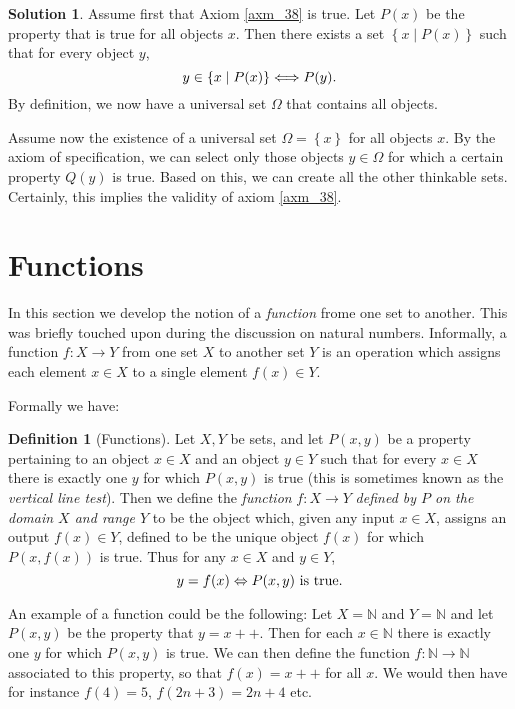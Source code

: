 \documentclass[a4paper, twocolumn]{report}
\newcounter{dummy} \numberwithin{dummy}{section}
\theoremstyle{definition}
\newtheorem{defn}[dummy]{Definition}
\theoremstyle{solution}
\newtheorem*{sltn}{Solution}
\newcommand{\dplus}{{+}{+}} %
\begin{document}
\begin{sltn}
  Assume first that Axiom \ref{axm_38} is true.  Let $P(x)$ be the property
  that is true for all objects $x$. Then there exists a set $\left\{ x \mid
  P(x) \right\}$ such that for every object $y$,
  \begin{equation}
    \notag
    y \in \left\{ x \mid P(x) \right\} \Longleftrightarrow P(y).
  \end{equation}
  By definition, we now have a universal set $\Omega$ that contains all
  objects.   

  Assume now the existence of a universal set $\Omega = \left\{ x \right\}$ for
  all objects $x$.  By the axiom of specification, we can select only those
  objects $y \in \Omega$ for which a certain property $Q(y)$ is true. Based on
  this, we can create all the other thinkable sets. Certainly, this implies the
  validity of axiom \ref{axm_38}. 
\end{sltn}

\section{Functions}

In this section we develop the notion of a \textit{function} frome one set to
another.  This was briefly touched upon during the discussion on natural
numbers. Informally, a function $f : X \rightarrow Y$ from one set $X$ to
another set $Y$ is an operation which assigns each element $x \in X$ to a
single element $f(x) \in Y$. 

Formally we have:
\begin{defn}[Functions]
  \label{defn_331} 
  Let $X, Y$ be sets, and let $P(x, y)$ be a property pertaining to an object
  $x \in X$ and an object $y \in Y$ such that for every $x \in X$ there is
  exactly one $y$ for which $P(x, y)$ is true (this is sometimes known as the
  \textit{vertical line test}). Then we define the \textit{function} $f : X
  \rightarrow Y$ \textit{defined by $P$ on the domain $X$ and range $Y$} to be
  the object which, given any input $x \in X$, assigns an output $f(x) \in Y$,
  defined to be the unique object $f(x)$ for which $P(x, f(x))$ is true.  Thus
  for any $x \in X$ and $y \in Y$,
  \begin{equation}
    \notag
    y = f(x) \Leftrightarrow P(x, y) \text{ is true}.
  \end{equation}
\end{defn}
\addtocounter{dummy}{5}
An example of a function could be the following: Let $X = \mathbb{N}$ and $Y =
\mathbb{N}$ and let $P(x, y)$ be the property that $y = x\dplus$. Then for each $x
\in \mathbb{N}$ there is exactly one $y$ for which $P(x, y)$ is true. We can
then define the function $f : \mathbb{N} \rightarrow \mathbb{N}$ associated to
this property, so that $f(x) = x++$ for all $x$. We would then have for
instance $f(4) = 5$, $f(2n+3) = 2n + 4$ etc. 
\end{document}
